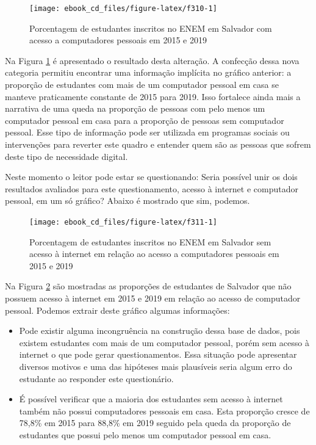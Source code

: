 \documentclass[
  portuguese,
  oneside]{book}
\providecommand{\tightlist}{%
  \setlength{\itemsep}{0pt}\setlength{\parskip}{0pt}}
\begin{document}
\begin{figure}

{\centering \texttt{[image: ebook\_cd\_files/figure-latex/f310-1]} 

}

\caption{Porcentagem de estudantes inscritos no ENEM em Salvador com acesso a computadores pessoais em 2015 e 2019}\label{fig:f310}
\end{figure}

Na Figura \ref{fig:f310} é apresentado o resultado desta alteração. A confecção dessa nova categoria permitiu encontrar uma informação implícita no gráfico anterior: a proporção de estudantes com mais de um computador pessoal em casa se manteve praticamente constante de 2015 para 2019. Isso fortalece ainda mais a narrativa de uma queda na proporção de pessoas com pelo menos um computador pessoal em casa para a proporção de pessoas sem computador pessoal. Esse tipo de informação pode ser utilizada em programas sociais ou intervenções para reverter este quadro e entender quem são as pessoas que sofrem deste tipo de necessidade digital.

Neste momento o leitor pode estar se questionando: Seria possível unir os dois resultados avaliados para este questionamento, acesso à internet e computador pessoal, em um só gráfico? Abaixo é mostrado que sim, podemos.

\begin{figure}

{\centering \texttt{[image: ebook\_cd\_files/figure-latex/f311-1]} 

}

\caption{Porcentagem de estudantes inscritos no ENEM em Salvador sem acesso à internet em relação ao acesso a computadores pessoais em 2015 e 2019}\label{fig:f311}
\end{figure}

Na Figura \ref{fig:f311} são mostradas as proporções de estudantes de Salvador que não possuem acesso à internet em 2015 e 2019 em relação ao acesso de computador pessoal. Podemos extrair deste gráfico algumas informações:

\begin{itemize}
\tightlist
\item
  Pode existir alguma incongruência na construção dessa base de dados, pois existem estudantes com mais de um computador pessoal, porém sem acesso à internet o que pode gerar questionamentos. Essa situação pode apresentar diversos motivos e uma das hipóteses mais plausíveis seria algum erro do estudante ao responder este questionário.
\item
  É possível verificar que a maioria dos estudantes sem acesso à internet também não possui computadores pessoais em casa. Esta proporção cresce de 78,8\% em 2015 para 88,8\% em 2019 seguido pela queda da proporção de estudantes que possui pelo menos um computador pessoal em casa.
\end{itemize}
\end{document}
